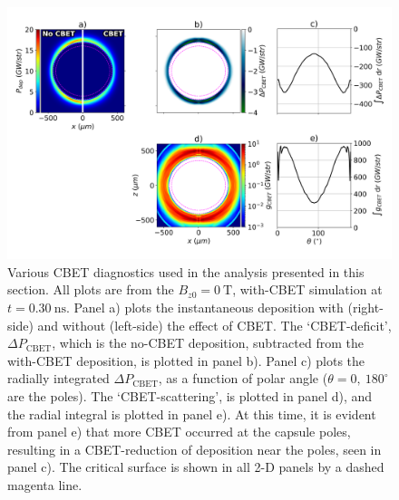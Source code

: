 \begin{figure}[t!]
    \includegraphics[width=\linewidth]{Results2/Images/magcbet_analysis.png}
    \centering
    \caption{Various \ac{CBET} diagnostics used in the analysis presented in this section.
    All plots are from the $B_{z0}=0\ \text{T}$, with-\ac{CBET} simulation at $t=0.30\ \text{ns}$.
    Panel a) plots the instantaneous deposition with (right-side) and without (left-side) the effect of \ac{CBET}.
    The `\ac{CBET}-deficit', $\Delta P_{\text{CBET}}$, which is the no-\ac{CBET} deposition, subtracted from the with-\ac{CBET} deposition, is plotted in panel b).
    Panel c) plots the radially integrated $\Delta P_{\text{CBET}}$, as a function of polar angle ($\theta=0,\ 180^{\circ}$ are the poles).
    The `\ac{CBET}-scattering', is plotted in panel d), and the radial integral is plotted in panel e).
    At this time, it is evident from panel e) that more \ac{CBET} occurred at the capsule poles, resulting in a \ac{CBET}-reduction of deposition near the poles, seen in panel c).
    The critical surface is shown in all 2-D panels by a dashed magenta line.}%
    \label{fig:Res2_magcbet_analysis}
\end{figure}

